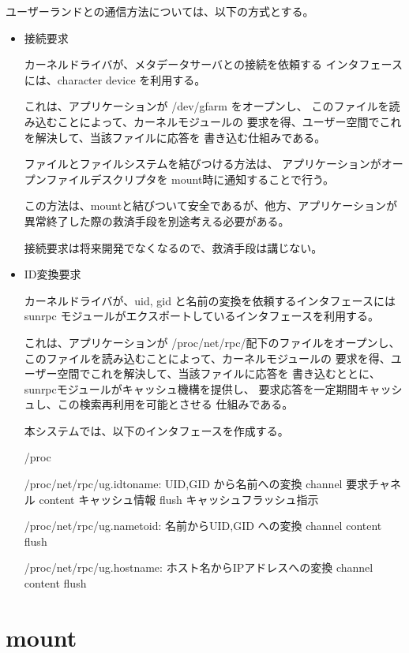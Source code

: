 ユーザーランドとの通信方法については、以下の方式とする。
\begin{itemize}
\item	接続要求	\par
	カーネルドライバが、メタデータサーバとの接続を依頼する
	インタフェースには、character device を利用する。

	これは、アプリケーションが /dev/gfarm をオープンし、
	このファイルを読み込むことによって、カーネルモジュールの
	要求を得、ユーザー空間でこれを解決して、当該ファイルに応答を
	書き込む仕組みである。

	ファイルとファイルシステムを結びつける方法は、
	アプリケーションがオープンファイルデスクリプタを
	mount時に通知することで行う。

	この方法は、mountと結びついて安全であるが、他方、アプリケーションが
	異常終了した際の救済手段を別途考える必要がある。

	接続要求は将来開発でなくなるので、救済手段は講じない。

\item	ID変換要求	\par
	カーネルドライバが、uid, gid と名前の変換を依頼するインタフェースには
	sunrpc モジュールがエクスポートしているインタフェースを利用する。

	これは、アプリケーションが /proc/net/rpc/配下のファイルをオープンし、
	このファイルを読み込むことによって、カーネルモジュールの
	要求を得、ユーザー空間でこれを解決して、当該ファイルに応答を
	書き込むととに、sunrpcモジュールがキャッシュ機構を提供し、
	要求応答を一定期間キャッシュし、この検索再利用を可能とさせる
	仕組みである。

	本システムでは、以下のインタフェースを作成する。
	\begin{itembox}[l]{/proc}\begin{cprog}
	/proc/net/rpc/ug.idtoname:	UID,GID から名前への変換
			   channel	要求チャネル
			   content	キャッシュ情報
			   flush	キャッシュフラッシュ指示

	/proc/net/rpc/ug.nametoid:	名前からUID,GID への変換
			   channel
			   content
			   flush

	/proc/net/rpc/ug.hostname:	ホスト名からIPアドレスへの変換
			   channel
			   content
			   flush
	\end{cprog}\end{itembox}

\end{itemize}

\section{mount}

